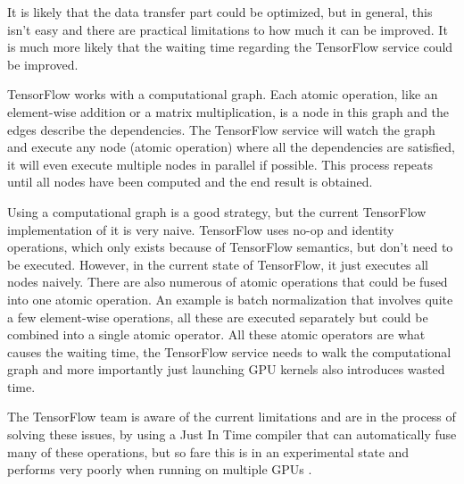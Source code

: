 It is likely that the data transfer part could be optimized, but in general, this isn't easy and there are practical limitations to how much it can be improved. It is much more likely that the waiting time regarding the TensorFlow service could be improved.

TensorFlow works with a computational graph. Each atomic operation, like an element-wise addition or a matrix multiplication, is a node in this graph and the edges describe the dependencies. The TensorFlow service will watch the graph and execute any node (atomic operation) where all the dependencies are satisfied, it will even execute multiple nodes in parallel if possible. This process repeats until all nodes have been computed and the end result is obtained.

Using a computational graph is a good strategy, but the current TensorFlow implementation of it is very naive. TensorFlow uses no-op and identity operations, which only exists because of TensorFlow semantics, but don't need to be executed. However, in the current state of TensorFlow, it just executes all nodes naively. There are also numerous of atomic operations that could be fused into one atomic operation. An example is batch normalization that involves quite a few element-wise operations, all these are executed separately but could be combined into a single atomic operator. All these atomic operators are what causes the waiting time, the TensorFlow service needs to walk the computational graph and more importantly just launching GPU kernels also introduces wasted time.

The TensorFlow team is aware of the current limitations and are in the process of solving these issues, by using a Just In Time compiler that can automatically fuse many of these operations, but so fare this is in an experimental state and performs very poorly when running on multiple GPUs \cite{citation-needed}.
